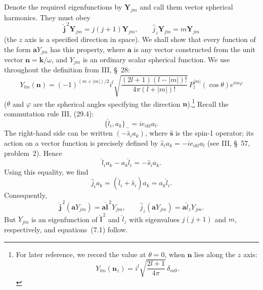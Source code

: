 Denote the required eigenfunctions by $\mathbf Y_{jm}$ and call them vector spherical harmonics. They must obey
\begin{equation}
\widehat{\mathbf j}^{\,2}\mathbf Y_{jm}=j(j+1)\mathbf Y_{jm},
\qquad
\widehat j_z\mathbf Y_{jm}=m\mathbf Y_{jm}
\tag{7.1}
\end{equation}
(the $z$ axis is a specified direction in space). We shall show that every function of the form $\mathbf aY_{jm}$ has this property, where $\mathbf a$ is any vector constructed from the unit vector $\mathbf n=\mathbf k/\omega$, and $Y_{jm}$ is an ordinary scalar spherical function. We use throughout the definition from III, \S~28:
\begin{equation}
Y_{lm}(\mathbf n)=(-1)^{(m+|m|)/2}i^l
\sqrt{\frac{(2l+1)(l-|m|)!}{4\pi(l+|m|)!}}\,
P_l^{|m|}(\cos\theta)e^{im\varphi}
\tag{7.2}
\end{equation}
\noindent
($\theta$ and $\varphi$ are the spherical angles specifying the direction $\mathbf n$).\footnote{For later reference, we record the value at $\theta=0$, when $\mathbf n$ lies along the $z$ axis:
\begin{equation}
Y_{lm}(\mathbf n_z)=i^l\sqrt{\frac{2l+1}{4\pi}}\,\delta_{m0}.
\tag{7.2a}
\end{equation}}
Recall the commutation rule III, (29.4):
\[
\{\widehat l_i,a_k\}_{-}=ie_{ikl}a_l.
\]
The right-hand side can be written $(-\widehat s_i a_k)$, where $\widehat{\mathbf s}$ is the spin-1 operator; its action on a vector function is precisely defined by $\widehat s_i a_k=-ie_{ikl}a_l$ (see III, \S~57, problem~2). Hence
\[
\widehat l_i a_k-a_k\widehat l_i=-\widehat s_i a_k.
\]
Using this equality, we find
\[
\widehat j_i a_k=(\widehat l_i+\widehat s_i)a_k=a_k\widehat l_i.
\]
Consequently,
\[
\widehat{\mathbf j}^{\,2}(\mathbf aY_{jm})
=\mathbf a\widehat{\mathbf l}^{\,2}Y_{jm},
\qquad
\widehat j_z(\mathbf aY_{jm})=\mathbf a\widehat l_zY_{jm}.
\]
But $Y_{jm}$ is an eigenfunction of $\widehat{\mathbf l}^{\,2}$ and $\widehat l_z$ with eigenvalues $j(j+1)$ and $m$, respectively, and equations~(7.1) follow.

